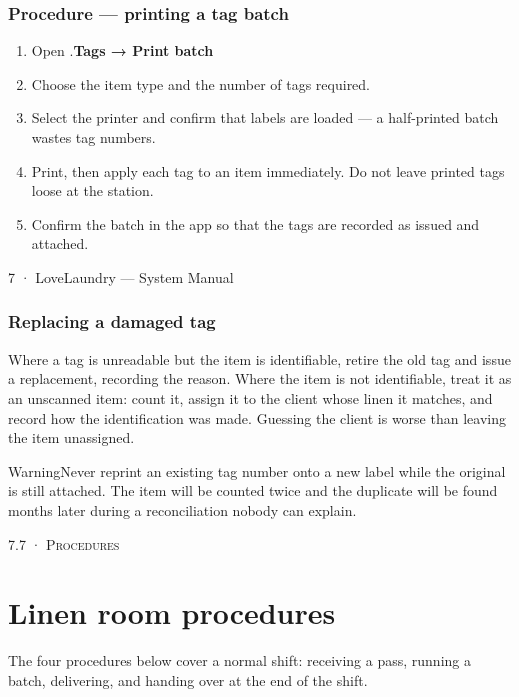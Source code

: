 \documentclass[11pt,a4paper,oneside]{book}
\begin{document}
\subsubsection*{Procedure — printing a tag batch}
\begin{enumerate}
\item Open .\textbf{Tags → Print batch}
\item Choose the item type and the number of tags required.
\item Select the printer and confirm that labels are loaded — a half-printed batch wastes tag numbers.
\item Print, then apply each tag to an item immediately. Do not leave printed tags loose at the station.
\item Confirm the batch in the app so that the tags are recorded as issued and attached.
\end{enumerate}
7 · LoveLaundry — System Manual

\subsubsection*{Replacing a damaged tag}
Where a tag is unreadable but the item is identifiable, retire the old tag and issue a replacement, recording the reason. Where the item is not identifiable, treat it as an unscanned item: count it, assign it to the client whose linen it matches, and record how the identification was made. Guessing the client is worse than leaving the item unassigned.

\begin{notebox}WarningNever reprint an existing tag number onto a new label while the original is still attached. The item will be counted twice and the duplicate will be found months later during a reconciliation nobody can explain.\end{notebox}
\textsc{\small\color{crimson}7.7 · Procedures}\par\medskip
\section*{Linen room procedures}
The four procedures below cover a normal shift: receiving a pass, running a batch, delivering, and handing over at the end of the shift.
\end{document}
